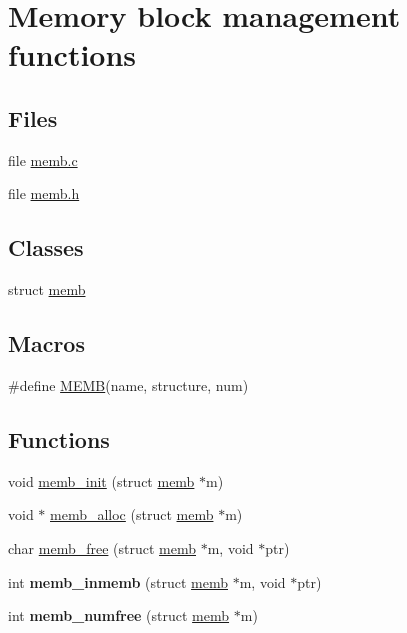\hypertarget{group__memb}{}\section{Memory block management functions}
\label{group__memb}
\subsection*{Files}
\begin{DoxyCompactItemize}
\item 
file \hyperlink{memb_8c}{memb.\+c}
\item 
file \hyperlink{memb_8h}{memb.\+h}
\end{DoxyCompactItemize}
\subsection*{Classes}
\begin{DoxyCompactItemize}
\item 
struct \hyperlink{structmemb}{memb}
\end{DoxyCompactItemize}
\subsection*{Macros}
\begin{DoxyCompactItemize}
\item 
\#define \hyperlink{group__memb_gaf31774d02a69fd3f1c2b282454438cba}{M\+E\+M\+B}(name,  structure,  num)
\end{DoxyCompactItemize}
\subsection*{Functions}
\begin{DoxyCompactItemize}
\item 
void \hyperlink{group__memb_gab8f8dad927b501d8b4ed4340d1bcf4fb}{memb\+\_\+init} (struct \hyperlink{structmemb}{memb} $\ast$m)
\item 
void $\ast$ \hyperlink{group__memb_ga9eb12536c921ee25d3886ed9640fe6fe}{memb\+\_\+alloc} (struct \hyperlink{structmemb}{memb} $\ast$m)
\item 
char \hyperlink{group__memb_ga513698da82ec79ec7115ffa0d80df77d}{memb\+\_\+free} (struct \hyperlink{structmemb}{memb} $\ast$m, void $\ast$ptr)
\item 
\hypertarget{group__memb_ga5f27331634d09c481815d8fe2b6394de}{}int {\bfseries memb\+\_\+inmemb} (struct \hyperlink{structmemb}{memb} $\ast$m, void $\ast$ptr)\label{group__memb_ga5f27331634d09c481815d8fe2b6394de}

\item 
\hypertarget{group__memb_gae13c7c0ca9c05bd1b3301e23574ab227}{}int {\bfseries memb\+\_\+numfree} (struct \hyperlink{structmemb}{memb} $\ast$m)\label{group__memb_gae13c7c0ca9c05bd1b3301e23574ab227}

\end{DoxyCompactItemize}


